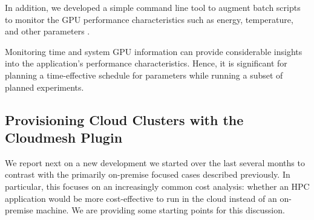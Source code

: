 \documentclass[sigconf]{acmart}
\begin{document}


In addition, we developed a simple command line tool to augment batch scripts to monitor the GPU performance characteristics such as energy, temperature, and other parameters \citep{cloudmesh-gpu}. 





Monitoring time and system GPU information can provide considerable insights into the application's performance characteristics. Hence, it is significant for planning a time-effective schedule for parameters while running a subset of planned experiments.

\subsection{Provisioning Cloud Clusters with the Cloudmesh Plugin}
\label{sec:cloudcluster}

We report next on a new development we started over the last several months to contrast with the primarily on-premise focused cases described previously. In particular, this focuses on an increasingly common cost analysis: whether an HPC application would be more cost-effective to run in the cloud instead of an on-premise machine. We are providing some starting points for this discussion.
\end{document}
